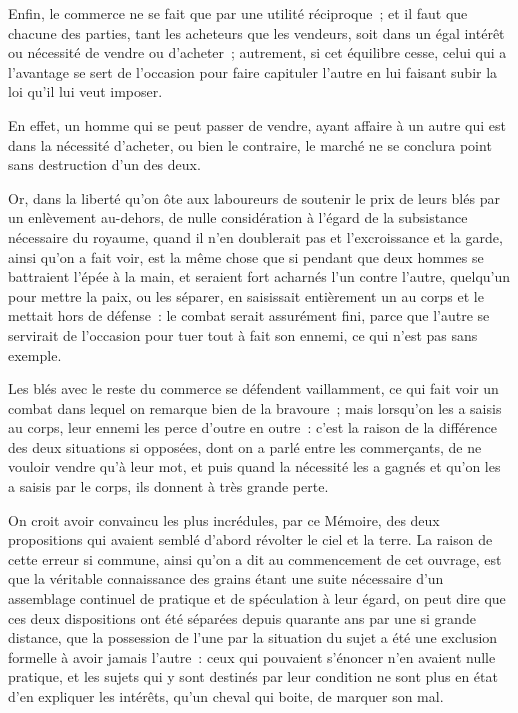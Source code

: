 \documentclass[french,twoside]{book} %
\begin{document}
Enfin, le commerce ne se fait que par une utilité réciproque ; et il faut que chacune des parties, tant les acheteurs que les vendeurs, soit dans un égal intérêt ou nécessité de vendre ou d’acheter ; autrement, si cet équilibre cesse, celui qui a l’avantage se sert de l’occasion pour faire capituler l’autre en lui faisant subir la loi qu’il lui veut imposer.\par
En effet, un homme qui se peut passer de vendre, ayant affaire à un autre qui est dans la nécessité d’acheter, ou bien le contraire, le marché ne se conclura point sans destruction d’un des deux.\par
Or, dans la liberté qu’on ôte aux laboureurs de soutenir le prix de leurs blés par un enlèvement au-dehors, de nulle considération à l’égard de la subsistance nécessaire du royaume, quand il n’en doublerait pas et l’excroissance et la garde, ainsi qu’on a fait voir, est la même chose que si pendant que deux hommes se battraient l’épée à la main, et seraient fort acharnés l’un contre l’autre, quelqu’un pour mettre la paix, ou les séparer, en saisissait entièrement un au corps et le mettait hors de défense : le combat serait assurément fini, parce que l’autre se servirait de l’occasion pour tuer tout à fait son ennemi, ce qui n’est pas sans exemple.\par
Les blés avec le reste du commerce se défendent vaillamment, ce qui fait voir un combat dans lequel on remarque bien de la bravoure ; mais lorsqu’on les a saisis au corps, leur ennemi les perce d’outre en outre : c’est la raison de la différence des deux situations si opposées, dont on a parlé entre les commerçants, de ne vouloir vendre qu’à leur mot, et puis quand la nécessité les a gagnés et qu’on les a saisis par le corps, ils donnent à très grande perte.\par
On croit avoir convaincu les plus incrédules, par ce Mémoire, des deux propositions qui avaient semblé d’abord révolter le ciel et la terre. La raison de cette erreur si commune, ainsi qu’on a dit au commencement de cet ouvrage, est que la véritable connaissance des grains étant une suite nécessaire d’un assemblage continuel de pratique et de spéculation à leur égard, on peut dire que ces deux dispositions ont été séparées depuis quarante ans par une si grande distance, que la possession de l’une par la situation du sujet a été une exclusion formelle à avoir jamais l’autre : ceux qui pouvaient s’énoncer n’en avaient nulle pratique, et les sujets qui y sont destinés par leur condition ne sont plus en état d’en expliquer les intérêts, qu’un cheval qui boite, de marquer son mal.\par
\end{document}
